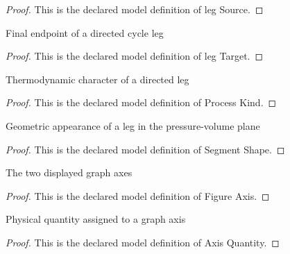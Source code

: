 \begin{proof}
  This is the declared model definition of leg Source.
\end{proof}
\begin{definition}
  \label{def:physics:phyx-mini-0430:phyxminiproblems-problemphyxmini0430-legtarget}
  Final endpoint of a directed cycle leg
\end{definition}
\begin{proof}
  This is the declared model definition of leg Target.
\end{proof}
\begin{definition}
  \label{def:physics:phyx-mini-0430:phyxminiproblems-problemphyxmini0430-processkind}
  Thermodynamic character of a directed leg
\end{definition}
\begin{proof}
  This is the declared model definition of Process Kind.
\end{proof}
\begin{definition}
  \label{def:physics:phyx-mini-0430:phyxminiproblems-problemphyxmini0430-segmentshape}
  Geometric appearance of a leg in the pressure-volume plane
\end{definition}
\begin{proof}
  This is the declared model definition of Segment Shape.
\end{proof}
\begin{definition}
  \label{def:physics:phyx-mini-0430:phyxminiproblems-problemphyxmini0430-figureaxis}
  The two displayed graph axes
\end{definition}
\begin{proof}
  This is the declared model definition of Figure Axis.
\end{proof}
\begin{definition}
  \label{def:physics:phyx-mini-0430:phyxminiproblems-problemphyxmini0430-axisquantity}
  Physical quantity assigned to a graph axis
\end{definition}
\begin{proof}
  This is the declared model definition of Axis Quantity.
\end{proof}
